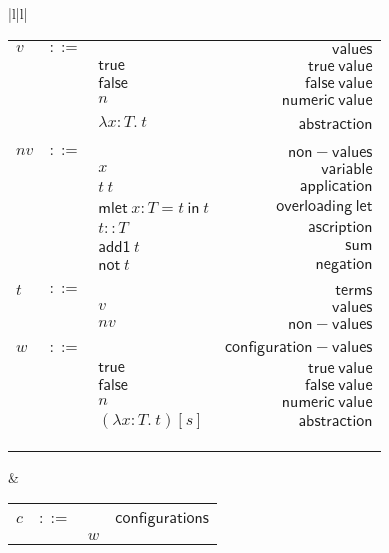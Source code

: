 \documentclass[preprint,authoryear,sort&compress,9pt,nocopyrightspace]{article}
\newcommand{\conf}[2][s]{(#2)[#1]}
\newcommand{\ascrip}[1]{#1::T}
\newcommand{\oletD}{\mathsf{mlet} \ x : T = t \ \mathsf{in}  \ t}
\newcommand{\app}[2]{#1 \ #2}
\newcommand{\abs}[3]{\lambda #1:#2. \ #3}
\newcommand{\negacion}[1]{\mathsf{not} \ #1}
\newcommand{\suma}[1]{\mathsf{add1} \ #1}
\newcommand{\truet}{\mathsf{true}}
\newcommand{\falset}{\mathsf{false}}
\begin{document}
\setlength{\topmargin}{-25mm}
\setlength{\textheight}{230mm}

\begin{figure}
\begin{small}
\begin{center}
\hspace*{-2cm}
\begin{tabular}{|l|l|}
\hline
\begin{tabular}{l c l r}
$v$&$::=$&&$\mathsf {values}$\\
&&$\truet$&$\mathsf {true \ value}$\\
&&$\falset$&$\mathsf {false \ value}$\\
&&$n$&$\mathsf {numeric \ value}$\\
&&$\abs {x}{T}{t}$&\ $\mathsf {abstraction}$\\
&&&\\
$nv$&$::=$&&$\mathsf {non-values}$\\
&&$x$&$\mathsf {variable}$\\
&&$\app {t}{t}$&$\mathsf {application}$\\
&&$\oletD$&$\mathsf {overloading \ let}$\\
&&$\ascrip {t}$&$\mathsf {ascription}$\\
&&$\suma{t}$&$\mathsf {sum}$\\
&&$\negacion{t}$&$\mathsf {negation}$\\
&&&\\
$t$&$::=$&&$\mathsf {terms}$\\
&&$v$&$\mathsf {values}$\\
&&$nv$&$\mathsf {non-values}$\\
&&&\\
$w$&$::=$&&$\mathsf {configuration-values}$\\
&&$\truet$&$\mathsf{true \ value} $\\
&&$\falset$&$\mathsf{false \ value}$\\
&&$n$&$\mathsf{numeric \ value} $\\
&&$\conf{\abs {x}{T}{t}}$&$\mathsf{abstraction}$\\
&&&\\
&&&\\
&&&\\
\end{tabular}
& \begin{tabular}{l c l r}
&&&\\
$c$&$::=$&&$\mathsf {configurations}$\\
&&$w$&\\

\end{tabular}
\end{tabular}
\end{center}
\end{small}
\end{figure}
\end{document}
